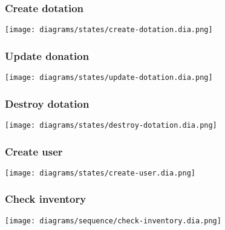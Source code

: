 \subsubsection{Create dotation}
\texttt{[image: diagrams/states/create-dotation.dia.png]}

\subsubsection{Update donation}
\texttt{[image: diagrams/states/update-dotation.dia.png]}

\subsubsection{Destroy dotation}
\texttt{[image: diagrams/states/destroy-dotation.dia.png]}

\subsubsection{Create user}
\texttt{[image: diagrams/states/create-user.dia.png]}

\subsubsection{Check inventory}
\texttt{[image: diagrams/sequence/check-inventory.dia.png]}

